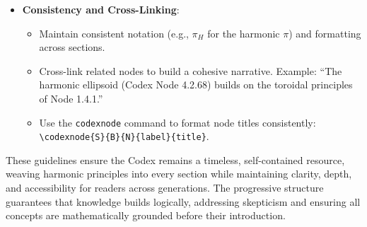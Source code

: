 \begin{itemize}
    \item \textbf{Consistency and Cross-Linking}: 
    \begin{itemize}
        \item Maintain consistent notation (e.g., \(\pi_H\) for the harmonic \(\pi\)) and formatting across sections.
        \item Cross-link related nodes to build a cohesive narrative. Example: ``The harmonic ellipsoid (Codex Node 4.2.68) builds on the toroidal principles of Node 1.4.1.''
        \item Use the \texttt{codexnode} command to format node titles consistently: \texttt{\textbackslash codexnode\{S\}\{B\}\{N\}\{label\}\{title\}}.
    \end{itemize}
\end{itemize}

These guidelines ensure the Codex remains a timeless, self-contained resource, weaving harmonic principles into every section while maintaining clarity, depth, and accessibility for readers across generations. The progressive structure guarantees that knowledge builds logically, addressing skepticism and ensuring all concepts are mathematically grounded before their introduction.